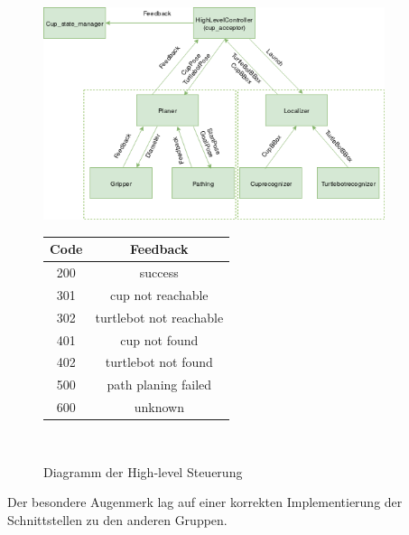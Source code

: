 \begin{figure}
\centering
\begin{minipage}[t]{.5\textwidth}
\centering
\vspace{0pt}
\includegraphics[width=10cm]{./images/highlevel_Diagram.png}
\caption{Diagramm der High-level Steuerung\label{fig:high-level-control}}
\end{minipage}\hfill
\begin{minipage}[t]{.3\textwidth}

\hfill

\centering
\vspace{0pt}
\begin{tabular}{ |c|c| }
 \hline
 Code & Feedback \\ 
 \hline
 200 & success \\ 
 301 & cup not reachable \\ 
 302 & turtlebot not reachable \\
 401 & cup not found \\
 402 & turtlebot not found \\
 500 & path planing failed \\
 600 & unknown \\ 
 \hline
\end{tabular}\\
\end{minipage}
\end{figure}

Der besondere Augenmerk lag auf einer korrekten Implementierung der Schnittstellen zu den anderen Gruppen.
